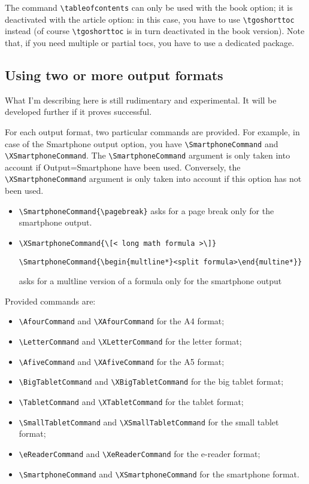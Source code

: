 \documentclass[english,ColorTheme=Red,FontSize=10pt]{tango}
\newcommand\TO[1]{\textsf{#1}}
\begin{document}
The command \verb+\tableofcontents+ can only be used with the \TO{book} option; it is deactivated with the \TO{article} option: in this case, you have to use \verb+\tgoshorttoc+ instead (of course \verb+\tgoshorttoc+ is in turn deactivated in the \TO{book} version). Note that, if you need multiple or partial tocs, you have to use a dedicated package.

\subsection{Using two or more output formats}
What I'm describing here is still rudimentary and experimental. It will be developed further if it proves successful. 

For each output format, two particular commands are provided. For example, in case of the \TO{Smartphone} output option, you have \verb+\SmartphoneCommand+ and \verb+\XSmartphoneCommand+. The \verb+\SmartphoneCommand+ argument is only taken into account if \TO{Output=Smartphone} have been used. Conversely, the \verb+\XSmartphoneCommand+ argument is only taken into account if this option has not been used.
\begin{example}[Examples]
\begin{itemize}
\item \verb+\SmartphoneCommand{\pagebreak}+ asks for a page break only for the smartphone output.
\item \verb+\XSmartphoneCommand{\[< long math formula >\]}+
\par \verb+\SmartphoneCommand{\begin{multline*}<split formula>\end{multine*}}+
\par asks for a multline version of a formula only for the smartphone output
\end{itemize}
\end{example}

Provided commands are:
\begin{itemize}
\item\verb+\AfourCommand+ and \verb+\XAfourCommand+ for the A4 format;
\item\verb+\LetterCommand+ and \verb+\XLetterCommand+ for the letter format;
\item\verb+\AfiveCommand+ and \verb+\XAfiveCommand+ for the A5 format;
\item\verb+\BigTabletCommand+ and \verb+\XBigTabletCommand+ for the big tablet format;
\item\verb+\TabletCommand+ and \verb+\XTabletCommand+ for the tablet format;
\item\verb+\SmallTabletCommand+ and \verb+\XSmallTabletCommand+ for the small tablet format;
\item\verb+\eReaderCommand+ and \verb+\XeReaderCommand+ for the e-reader format;
\item\verb+\SmartphoneCommand+ and \verb+\XSmartphoneCommand+ for the smartphone format.
\end{itemize}
\end{document}
